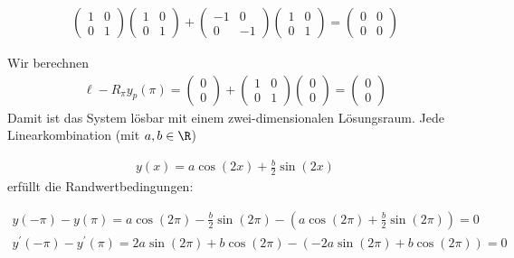\begin{solution}
\begin{enumerate}[label = \textbf{\alph*)}]
  \begin{align*}
    \begin{pmatrix}
      1 & 0 \\
      0 & 1
    \end{pmatrix}
    \begin{pmatrix}
      1 & 0 \\
      0 & 1
    \end{pmatrix}
    +
    \begin{pmatrix}
      -1 & 0 \\
      0 & -1
    \end{pmatrix}
    \begin{pmatrix}
      1 & 0 \\
      0 & 1
    \end{pmatrix}
    =
    \begin{pmatrix}
      0 & 0 \\
      0 & 0
    \end{pmatrix}
  \end{align*}

  Wir berechnen
  \begin{align*}
    \ell - R_{\pi}y_p(\pi) = \begin{pmatrix}
      0 \\ 0
    \end{pmatrix} +
    \begin{pmatrix}
      1 & 0 \\ 0 & 1
    \end{pmatrix}
    \begin{pmatrix}
      0 \\ 0
    \end{pmatrix}
    = \begin{pmatrix}
      0 \\ 0
    \end{pmatrix}
  \end{align*}
  Damit ist das System lösbar mit einem zwei-dimensionalen Lösungsraum.
  Jede Linearkombination (mit $a,b \in \R$)

  \begin{align*}
    y(x) = a \cos(2x) + \frac{b}{2} \sin(2x)
  \end{align*}
  erfüllt die Randwertbedingungen:

  \begin{align*}
    y(-\pi)-y(\pi) = a \cos(2\pi) - \frac{b}{2} \sin(2\pi) - (a \cos(2\pi) + \frac{b}{2} \sin(2\pi)) = 0 \\
    y^\prime(-\pi)-y^\prime(\pi) = 2a\sin(2\pi) + b\cos(2\pi) -(- 2a\sin(2\pi) + b\cos(2\pi)) = 0
  \end{align*}


\end{enumerate}
\end{solution}
